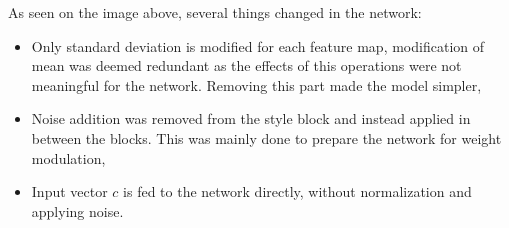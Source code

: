 \documentclass[11pt,a4paper,openany]{book}
\begin{document}
\noindent As seen on the image above, several things changed in the network:

\begin{itemize}
\item Only standard deviation is modified for each feature map, modification of mean was deemed redundant as the effects of this operations were not meaningful for the network. Removing this part made the model simpler,
\item Noise addition was removed from the style block and instead applied in between the blocks. This was mainly done to prepare the network for weight modulation,
\item Input vector $c$ is fed to the network directly, without normalization and applying noise.
\end{itemize}
%
%
%







\end{document}
